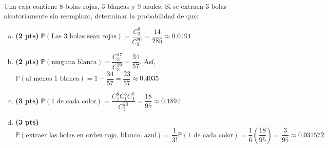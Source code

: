 \addpoints
\question[10] 
Una caja contiene 8 bolas rojas, 3 blancas y 9 azules. Si se extraen 3 bolas aleatoriamente sin reemplazo, determinar la probabilidad de que:
\noaddpoints
{}

\begin{solution}
\begin{enumerate}[a)]
\item \textbf{(2 pts)} $\displaystyle \mathbb{P}(\text{Las 3 bolas sean rojas})=\dfrac{C_{3}^{8}}{C_{3}^{20}}=\dfrac{14}{285}\approx 0.0491$
\item \textbf{(2 pts)} $\mathbb{P}(\text{ninguna blanca})=\dfrac{C_{3}^{17}}{C_{3}^{20}}=\dfrac{34}{57}$. Así, $\mathbb{P}(\text{al menos 1 blanca})=1-\dfrac{34}{57}=\dfrac{23}{57}\approx 0.4035$
\item \textbf{(3 pts)} $\mathbb{P}(\text{1 de cada color})=\dfrac{C_{1}^{8} C_{1}^{3} C_{1}^{9}}{C_{3}^{20}}=\dfrac{18}{95}\approx 0.1894$
\item \textbf{(3 pts)} $\mathbb{P}(\text{extraer las bolas en orden rojo, blanco, azul})=\dfrac{1}{3!}\mathbb{P}(\text{1 de cada color})=\dfrac{1}{6}\left( \dfrac{18}{95}\right)=\dfrac{3}{95}\approx 0.031572$
\end{enumerate}
\end{solution}